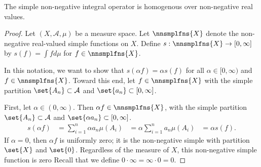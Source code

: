 \begin{prop}

The simple non-negative
integral operator
is homogenous
over non-negative
real values.

\begin{proof}

Let $(X, \mathcal{A}, \mu)$
be a measure space.
Let $\nnsmplfns{X}$ denote the
non-negative real-valued
simple functions on $X$.
Define
$s: \nnsmplfns{X} \to [0, \infty]$
by
$s(f) = \int f d\mu$
for
$f \in \nnsmplfns{X}$.

In this notation, we want to show
that
$s(\alpha f) = \alpha s(f)$
for all $\alpha \in [0, \infty)$
and $f \in \nnsmplfns{X}$.
Toward this end, let $f \in \nnsmplfns{X}$
with the simple partition
$\set{A_n} \subset \mathcal{A}$
and $\set{a_n} \subset [0, \infty]$.

%

First, let
$\alpha \in (0, \infty)$.
Then $\alpha f \in \nnsmplfns{X}$,
with the simple partition
$\set{A_n} \subset \mathcal{A}$
and $\set{\alpha a_n} \subset [0, \infty]$.
\[
  \begin{aligned}
  s(\alpha f) &= \sum_{i = 1}^{n} \alpha a_n \mu(A_i)
              &= \alpha \sum_{i = 1}^{n} a_n \mu(A_i)
              &= \alpha s(f).
  \end{aligned}
\]
If $\alpha = 0$, then $\alpha f$ is uniformly
zero; it is the non-negative simple
with partition $\set{X}$ and $\set{0}$.
Regardless of the measure of $X$,
this non-negative simple function is zero
Recall that we define
$0 \cdot \infty = \infty \cdot 0 = 0$.
\end{proof}

\end{prop}
\strats
